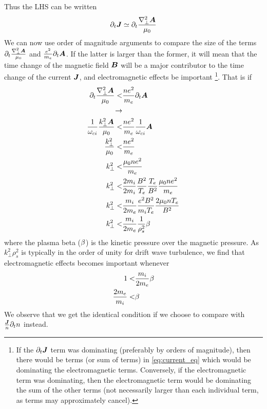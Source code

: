 %
Thus the LHS can be written
%
\begin{align*}
    \partial_t \boldsymbol{J} \simeq \partial_t \frac{\nabla^2_\perp\boldsymbol{A}}{\mu_0}
\end{align*}
%
We can now use order of magnitude arguments to compare the size of the terms $\partial_t \frac{\nabla^2_\perp\boldsymbol{A}}{\mu_0}$ and $\frac{e^2}{m_e}\partial_t \boldsymbol{A}$.
If the latter is larger than the former, it will mean that the time change of the magnetic field $\boldsymbol{B}$ will be a major contributor to the time change of the current $\boldsymbol{J}$, and electromagnetic effects be important%
%
\footnote{
    If the $\partial_t \boldsymbol{J}$ term was dominating (preferably by orders of magnitude), then there would be terms (or sum of terms) in \cref{eq:current_eq} which would be dominating the electromagnetic terms.
    Conversely, if the electromagnetic term was dominating, then the electromagnetic term would be dominating the sum of the other terms (not necessarily larger than each individual term, as terms may approximately cancel).
}.%
%
That is if
%
\begin{align*}
    \partial_t \frac{\nabla^2_\perp\boldsymbol{A}}{\mu_0}
    < &
    \frac{ne^2}{m_e}\partial_t \boldsymbol{A}
    \\
    \rightarrow &
    \\
    \frac{1}{\omega_{ci}} \frac{k_\perp^2\boldsymbol{A}}{\mu_0}
    < &
    \frac{ne^2}{m_e}\frac{1}{\omega_{ci}} \boldsymbol{A}
    \\
    \frac{k_\perp^2}{\mu_0}
    < &
    \frac{ne^2}{m_e}
    \\
    k_\perp^2
    < &
    \frac{\mu_0ne^2}{m_e}
    \\
    k_\perp^2
    < &
    \frac{2m_i}{2m_i}\frac{B^2}{T_e}\frac{T_e}{B^2}\frac{\mu_0ne^2}{m_e}
    \\
    k_\perp^2
    < &
    \frac{m_i}{2m_e}\frac{e^2B^2}{m_iT_e}\frac{2\mu_0nT_e}{B^2}
    \\
    k_\perp^2
    < &
    \frac{m_i}{2m_e}\frac{1}{\rho_s^2}\beta
\end{align*}
%
where the plasma beta ($\beta$) is the kinetic pressure over the magnetic pressure.
As $ k_\perp^2\rho_s^2$ is typically in the order of unity for drift wave turbulence, we find that electromagnetic effects becomes important whenever
%
\begin{align*}
    1
    < &
    \frac{m_i}{2m_e}\beta
    \\
    \frac{2m_e}{m_i}
    < &
    \beta
\end{align*}
%
We observe that we get the identical condition if we choose to compare with $\frac{\boldsymbol{J}}{n}\partial_t n$ instead.
